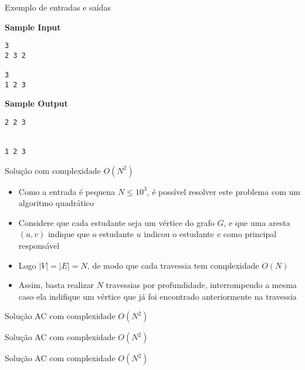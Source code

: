 \begin{frame}[fragile]{Exemplo de entradas e saídas}

\begin{minipage}[t]{0.5\textwidth}
\textbf{Sample Input}
\begin{verbatim}
3
2 3 2

3
1 2 3
\end{verbatim}
\end{minipage}
\begin{minipage}[t]{0.45\textwidth}
\textbf{Sample Output}
\begin{verbatim}
2 2 3 


1 2 3 
\end{verbatim}
\end{minipage}
\end{frame}

\begin{frame}[fragile]{Solução com complexidade $O(N^2)$}

    \begin{itemize}
        \item Como a entrada é pequena $N\leq 10^3$, é possível resolver este problema
            com um algoritmo quadrático

        \item Considere que cada estudante seja um vértice do grafo $G$, e que uma aresta
            $(u, v)$ indique que o estudante $u$ indicou o estudante $v$ como principal
            responsável

        \item Logo $|V| = |E| = N$, de modo que cada travessia tem complexidade $O(N)$

        \item Assim, basta realizar $N$ travessias por profundidade, interrompendo a 
            mesma caso ela indifique um vértice que já foi encontrado anteriormente na travessia
   \end{itemize}

\end{frame}

\begin{frame}[fragile]{Solução AC com complexidade $O(N^2)$}
\end{frame}

\begin{frame}[fragile]{Solução AC com complexidade $O(N^2)$}
\end{frame}

\begin{frame}[fragile]{Solução AC com complexidade $O(N^2)$}
\end{frame}

